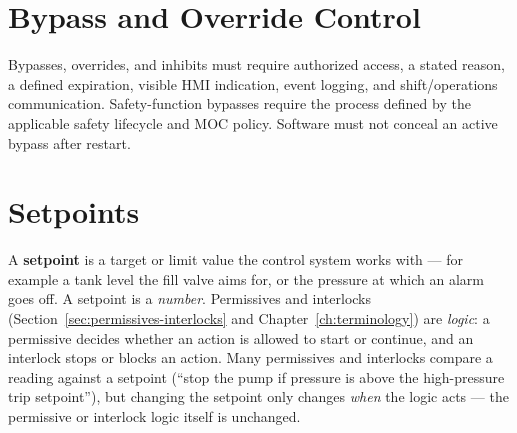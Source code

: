 \section{Bypass and Override Control}

Bypasses, overrides, and inhibits must require authorized access, a stated reason, a defined expiration, visible HMI indication, event logging, and shift/operations communication. Safety-function bypasses require the process defined by the applicable safety lifecycle and MOC policy. Software must not conceal an active bypass after restart.

\section{Setpoints}\label{sec:setpoints}
A \textbf{setpoint} is a target or limit value the control system works with --- for example a tank level the fill valve aims for, or the pressure at which an alarm goes off. A setpoint is a \emph{number}. Permissives and interlocks (Section~\ref{sec:permissives-interlocks} and Chapter~\ref{ch:terminology}) are \emph{logic}: a permissive decides whether an action is allowed to start or continue, and an interlock stops or blocks an action. Many permissives and interlocks compare a reading against a setpoint (``stop the pump if pressure is above the high-pressure trip setpoint''), but changing the setpoint only changes \emph{when} the logic acts --- the permissive or interlock logic itself is unchanged.

